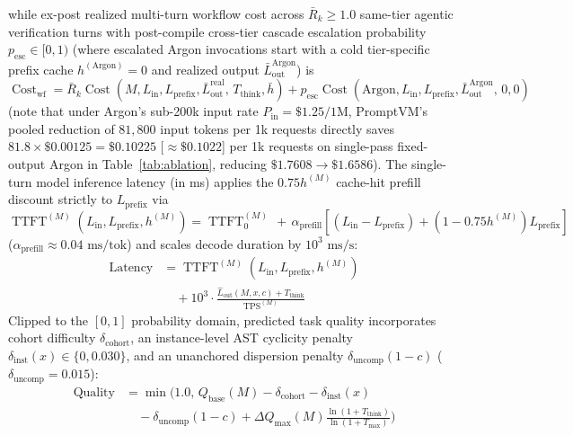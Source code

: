 \documentclass[conference,10pt]{IEEEtran}
\begin{document}
while ex-post realized multi-turn workflow cost across $\bar{R}_k \ge 1.0$ same-tier agentic verification turns with post-compile cross-tier cascade escalation probability $p_{\text{esc}} \in [0, 1)$ (where escalated Argon invocations start with a cold tier-specific prefix cache $h^{(\text{Argon})} = 0$ and realized output $\bar{L}_{\text{out}}^{\text{Argon}}$) is $\operatorname{Cost}_{\text{wf}} = \bar{R}_k \operatorname{Cost}(M, L_{\text{in}}, L_{\text{prefix}}, \bar{L}_{\text{out}}^{\text{real}},\, T_{\text{think}}, \bar{h}) + p_{\text{esc}} \operatorname{Cost}(\text{Argon}, L_{\text{in}}, L_{\text{prefix}}, \bar{L}_{\text{out}}^{\text{Argon}},\, 0, 0)$ (note that under Argon's sub-200k input rate $P_{\text{in}}=\$1.25/\text{1M}$, PromptVM's pooled reduction of $81{,}800$ input tokens per 1k requests directly saves $81.8 \times \$0.00125 = \$0.10225$ [$\approx \$0.1022$] per 1k requests on single-pass fixed-output Argon in Table~\ref{tab:ablation}, reducing $\$1.7608 \to \$1.6586$). The single-turn model inference latency (in ms) applies the $0.75 h^{(M)}$ cache-hit prefill discount strictly to $L_{\text{prefix}}$ via $\operatorname{TTFT}^{(M)}(L_{\text{in}}, L_{\text{prefix}}, h^{(M)}) = \operatorname{TTFT}_0^{(M)}\, +\, \alpha_{\text{prefill}}\left[(L_{\text{in}} - L_{\text{prefix}}) + (1 - 0.75 h^{(M)})L_{\text{prefix}}\right]$ ($\alpha_{\text{prefill}} \approx 0.04\text{ ms/tok}$) and scales decode duration by $10^3\text{ ms/s}$:
\begin{equation}
\label{eq:latency_formula}
\begin{split}
\operatorname{Latency} &= \operatorname{TTFT}^{(M)}(L_{\text{in}}, L_{\text{prefix}}, h^{(M)}) \\
&\quad + 10^3 \cdot \frac{\hat{L}_{\text{out}}(M, x, c) + T_{\text{think}}}{\operatorname{TPS}^{(M)}}
\end{split}
\end{equation}
Clipped to the $[0, 1]$ probability domain, predicted task quality incorporates cohort difficulty $\delta_{\text{cohort}}$, an instance-level AST cyclicity penalty $\delta_{\text{inst}}(x) \in \{0, 0.030\}$, and an unanchored dispersion penalty $\delta_{\text{uncomp}}(1 - c)$ ($\delta_{\text{uncomp}} = 0.015$):
\begin{equation}
\label{eq:quality_scaling}
\begin{aligned}
\operatorname{Quality} &= \min\!\Bigg(1.0,\, Q_{\text{base}}(M) - \delta_{\text{cohort}} - \delta_{\text{inst}}(x) \\
&\quad - \delta_{\text{uncomp}}(1 - c) + \Delta Q_{\max}(M) \frac{\ln(1 + T_{\text{think}})}{\ln(1 + T_{\max})}\Bigg)
\end{aligned}
\end{equation}
\end{document}
